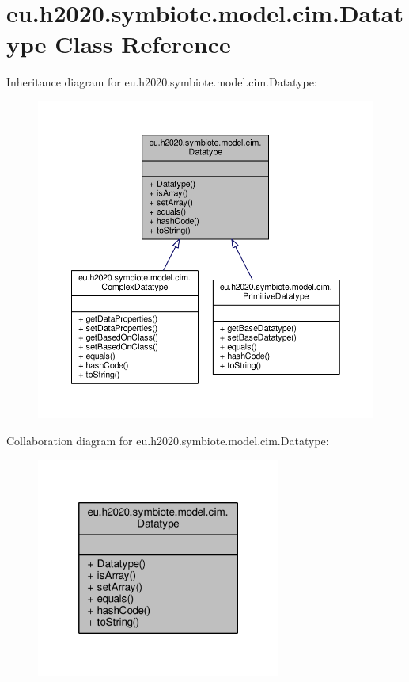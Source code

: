 \hypertarget{classeu_1_1h2020_1_1symbiote_1_1model_1_1cim_1_1Datatype}{}\section{eu.\+h2020.\+symbiote.\+model.\+cim.\+Datatype Class Reference}
\label{classeu_1_1h2020_1_1symbiote_1_1model_1_1cim_1_1Datatype}


Inheritance diagram for eu.\+h2020.\+symbiote.\+model.\+cim.\+Datatype\+:
\nopagebreak
\begin{figure}[H]
\begin{center}
\leavevmode
\includegraphics[width=350pt]{classeu_1_1h2020_1_1symbiote_1_1model_1_1cim_1_1Datatype__inherit__graph}
\end{center}
\end{figure}


Collaboration diagram for eu.\+h2020.\+symbiote.\+model.\+cim.\+Datatype\+:
\nopagebreak
\begin{figure}[H]
\begin{center}
\leavevmode
\includegraphics[width=228pt]{classeu_1_1h2020_1_1symbiote_1_1model_1_1cim_1_1Datatype__coll__graph}
\end{center}
\end{figure}
